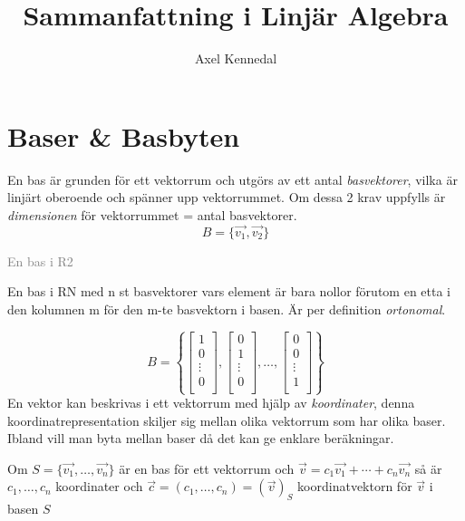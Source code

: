 \documentclass[11pt]{article}
\author{Axel Kennedal} %
\title{Sammanfattning i Linjär Algebra}
\newcommand{\comment}[1]{\begin{center}\textcolor{Gray}{#1} \end{center}}
\begin{document}
\maketitle
\tableofcontents
\newpage

\section{Baser \& Basbyten}
En bas är grunden för ett vektorrum och utgörs av ett antal \emph{basvektorer}, vilka är linjärt oberoende och spänner upp vektorrummet. Om dessa 2 krav uppfylls är \emph{dimensionen} för vektorrummet = antal basvektorer.
\begin{equation}
B = \{\vec{v_{1}}, \vec{v_{2}} \}
\end{equation}
\comment{En bas i R2}
En bas i RN med n st basvektorer vars element är bara nollor förutom en etta i den kolumnen m för den m-te basvektorn i basen.
Är per definition \emph{ortonomal}.

\begin{equation}
B = \left \{
\begin{bmatrix}
1 \\
0 \\
\vdots \\
0 \\
\end{bmatrix}
,
\begin{bmatrix}
0 \\
1 \\
\vdots \\
0 \\
\end{bmatrix}
, \ldots
,
\begin{bmatrix}
0 \\
0 \\
\vdots \\
1 \\
\end{bmatrix}
\right \}
\end{equation}
En vektor kan beskrivas i ett vektorrum med hjälp av \emph{koordinater}, denna koordinatrepresentation skiljer sig mellan olika vektorrum som har olika baser. Ibland vill man byta mellan baser 
då det kan ge enklare beräkningar.

Om $S = \{\vec{v_{1}}, \ldots, \vec{v_{n}}\}$ är en bas för ett vektorrum och $\vec{v} = c_{1}\vec{v_{1}} + \cdots + c_{n}\vec{v_{n}}$ så är $c_{1},\ldots,c_{n}$ koordinater och $\vec{c} = (c_{1}, \ldots, c_{n}) = (\vec{v})_{S}$ koordinatvektorn för $\vec{v}$ i basen $S$ 
\end{document}

